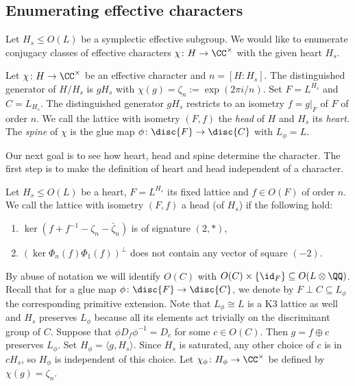 \subsection{Enumerating effective characters}
Let $H_s \leq O(L)$ be a symplectic effective subgroup.
We would like to enumerate conjugacy classes of effective characters $\chi \colon H \to \CC^\times$
with the given heart $H_s$.

\begin{definition}
Let $\chi\colon H \to \CC^\times$ be an effective character and $n=[H:H_s]$.
The distinguished generator of $H/H_s$ is $g H_s$ with $\chi(g) = \zeta_n:= \exp(2\pi i /n)$.
Set $F = L^{H_s}$ and $C= L_{H_s}$. The distinguished generator $gH_s$ restricts to an isometry $f=g|_F$ of $F$ of order $n$. We call the lattice with isometry $(F,f)$ the \emph{head} of $H$ and $H_s$ its \emph{heart}.
The \emph{spine} of $\chi$ is the glue map $\phi\colon \disc{F} \to \disc{C}$
with $L_\phi = L$.
\end{definition}

Our next goal is to see how heart, head and spine determine the character.
The first step is to make the definition of heart and head independent of a character.

\begin{definition}\label{heads and hearts}
 Let $H_s \leq O(L)$ be a heart, $F=L^{H_s}$ its fixed lattice and
 $f \in O(F)$ of order $n$. We call the lattice with isometry $(F,f)$ a head (of $H_s$) if the following hold:

 \begin{enumerate}
  \item $\ker(f+f^{-1} - \zeta_n - \bar \zeta_n)$ is of signature $(2,*)$,
  \item $(\ker \Phi_n(f)\Phi_1(f))^\perp$ does not contain any vector of square $(-2)$.
 \end{enumerate}

\end{definition}
By abuse of notation we will identify $O(C)$ with $O(C)\times \{\id_F\} \subseteq O(L\otimes \QQ)$.
Recall that for a glue map $\phi \colon \disc{F} \to \disc{C}$, we denote by $F \perp C \subseteq L_\phi$ the corresponding primitive extension.
Note that $L_\phi\cong L$ is a K3 lattice as well and $H_s$ preserves $L_\phi$ because all its elements act trivially on the discriminant group of $C$.
Suppose that $\phi D_f \phi^{-1} = D_c$ for some $c \in O(C)$.
Then $g = f \oplus c$ preserves $L_\phi$. Set  $H_\phi = \langle g , H_s \rangle$.
Since $H_s$ is saturated, any other choice of $c$ is in $cH_s$, so $H_\phi$ is independent of this choice. Let $\chi_\phi\colon H_\phi \to \CC^\times$ be defined by $\chi(g)=\zeta_n$.

